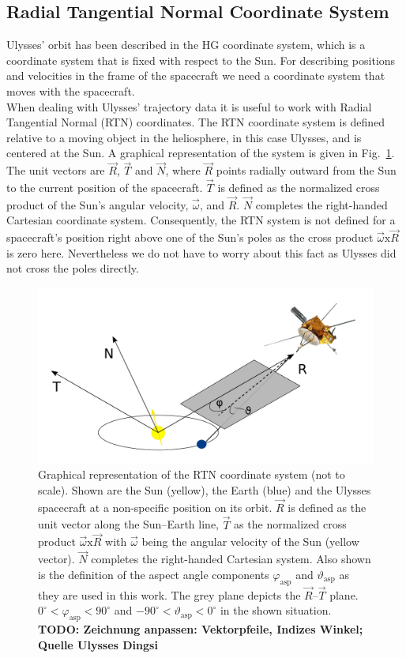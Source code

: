 \subsection{Radial Tangential Normal Coordinate System}
Ulysses' orbit has been described in the HG coordinate system, which is a coordinate system that is fixed with respect to the Sun. For describing positions and velocities in the frame of the spacecraft we need a coordinate system that moves with the spacecraft.
\\
When dealing with Ulysses' trajectory data it is useful to work with Radial Tangential Normal (RTN) coordinates. The RTN coordinate system is defined relative to a moving object in the heliosphere, in this case Ulysses, and is centered at the Sun. A graphical representation of the system is given in Fig.~\ref{fig:rtn}. The unit vectors are $\vec{R}$, $\vec{T}$ and $\vec{N}$, where $\vec{R}$ points radially outward from the Sun to the current position of the spacecraft. $\vec{T}$ is defined as the normalized cross product of the Sun's angular velocity, $\vec{\omega}$, and $\vec{R}$. $\vec{N}$ completes the right-handed Cartesian coordinate system. Consequently, the RTN system is not defined for a spacecraft's position right above one of the Sun's poles as the cross product $\vec{\omega} \mathrm{x} \vec{R}$ is zero here. Nevertheless we do not have to worry about this fact as Ulysses did not cross the poles directly.
%
%
\begin{figure}[h]
	\includegraphics[width=1\textwidth]{Figures/RTN_AA_angles.pdf}
	\centering
	\caption{Graphical representation of the RTN coordinate system (not to scale). Shown are the Sun (yellow), the Earth (blue) and the Ulysses spacecraft at a non-specific position on its orbit. $\vec{R}$ is defined as the unit vector along the Sun--Earth line, $\vec{T}$ as the normalized cross product $\vec{\omega} \mathrm{x} \vec{R}$ with $\vec{\omega}$ being the angular velocity of the Sun (yellow vector). $\vec{N}$ completes the right-handed Cartesian system. Also shown is the definition of the aspect angle components $\varphi_{\mathrm{asp}}$ and $\vartheta_{\mathrm{asp}}$ as they are used in this work. The grey plane depicts the $\vec{R}$--$\vec{T}$ plane. $0 ^\circ < \varphi_{\mathrm{asp}} < 90^\circ$ and $-90 ^\circ < \vartheta_{\mathrm{asp}} < 0^\circ$ in the shown situation. \textbf{TODO: Zeichnung anpassen: Vektorpfeile, Indizes Winkel; Quelle Ulysses Dingsi}}
	\label{fig:rtn}
\end{figure}
%
%
%
